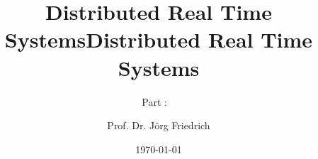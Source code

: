 

\ifoverview
\title[Distributed Real Time Systems - \partTitle \ (Version \partVersion)]{Distributed Real Time Systems}

\subtitle[\partTitle]{\partTitle}

\else

\title[Distributed Real Time Systems - Part \partNo :\ \partTitle \ (Version \partVersion)]{Distributed Real Time Systems}

\subtitle[Part  \partNo :\  \partTitle]{Part \partNo : \  \partTitle}

\fi

\author[Prof. Dr. Jörg Friedrich]{Prof. Dr. Jörg Friedrich}%


\ifpartII
{}
\fi


\date[\copyright{} 2018]{\today}

\makenoidxglossaries





